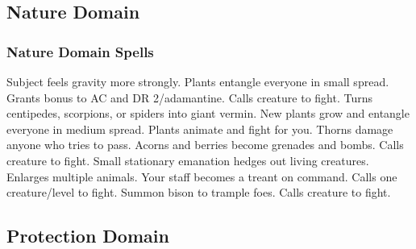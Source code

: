 \subsection{Nature Domain}

\subsubsection{Nature Domain Spells}
\begin{spelllist}
     Subject feels gravity more strongly.
   Plants entangle everyone in small spread.
   Grants  bonus to AC and DR 2/adamantine.
  \spellhead[2]{}
  \spellhead[3]{}
   Calls creature to fight.
   Turns centipedes, scorpions, or spiders into giant vermin.
   New plants grow and entangle everyone in medium spread.
   Plants animate and fight for you.
   Thorns damage anyone who tries to pass.
   Acorns and berries become grenades and bombs.
   Calls creature to fight.
   Small stationary emanation hedges out living creatures.
   Enlarges multiple animals.
   Your staff becomes a treant on command.
   Calls one creature/level to fight.
   Summon bison to trample foes.
   Calls creature to fight.
\end{spelllist}

\subsection{Protection Domain}
